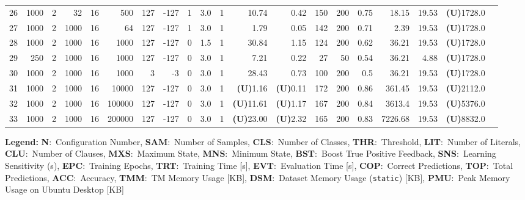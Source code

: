 \documentclass[english]{aghengthesis} %
\begin{document}
\begin{table}[!htbp]
\begin{tabular}{@{}r r r r r r r r r r r r r r r r r r r r@{}}
    26 & 1000 & 2 & 32 & 16 & 500 & 127 & -127 & 1 & 3.0 & 1 & 10.74 & 0.42 & 150 & 200 & 0.75 & 18.15 & 19.53 & \textbf{(U)}1728.0 \\
    27 & 1000 & 2 & 1000 & 16 & 64 & 127 & -127 & 1 & 3.0 & 1 & 1.79 & 0.05 & 142 & 200 & 0.71 & 2.39 & 19.53 & \textbf{(U)}1728.0 \\
    28 & 1000 & 2 & 1000 & 16 & 1000 & 127 & -127 & 0 & 1.5 & 1 & 30.84 & 1.15 & 124 & 200 & 0.62 & 36.21 & 19.53 & \textbf{(U)}1728.0 \\
    29 & 250 & 2 & 1000 & 16 & 1000 & 127 & -127 & 0 & 3.0 & 1 & 7.21 & 0.22 & 27 & 50 & 0.54 & 36.21 & 4.88 & \textbf{(U)}1728.0 \\
    30 & 1000 & 2 & 1000 & 16 & 1000 & 3 & -3 & 0 & 3.0 & 1 & 28.43 & 0.73 & 100 & 200 & 0.5 & 36.21 & 19.53 & \textbf{(U)}1728.0 \\
    31 & 1000 & 2 & 1000 & 16 & 10000 & 127 & -127 & 0 & 3.0 & 1 & \textbf{(U)}1.16 & \textbf{(U)}0.11 & 172 & 200 & 0.86 & 361.45 & 19.53 & \textbf{(U)}2112.0 \\
    32 & 1000 & 2 & 1000 & 16 & 100000 & 127 & -127 & 0 & 3.0 & 1 & \textbf{(U)}11.61 & \textbf{(U)}1.17 & 167 & 200 & 0.84 & 3613.4 & 19.53 & \textbf{(U)}5376.0 \\
    33 & 1000 & 2 & 1000 & 16 & 200000 & 127 & -127 & 0 & 3.0 & 1 & \textbf{(U)}23.00 & \textbf{(U)}2.32 & 165 & 200 & 0.83 & 7226.68 & 19.53 & \textbf{(U)}8832.0 \\ \bottomrule
\end{tabular}
\vspace{1ex}
\begin{flushleft}
\textbf{Legend:} 
\textbf{N}:~Configuration Number,
\textbf{SAM}:~Number of Samples, 
\textbf{CLS}:~Number of Classes, 
\textbf{THR}:~Threshold, 
\textbf{LIT}:~Number of Literals, 
\textbf{CLU}:~Number of Clauses, 
\textbf{MXS}:~Maximum State,
\textbf{MNS}:~Minimum State,
\textbf{BST}:~Boost True Positive Feedback,
\textbf{SNS}:~Learning Sensitivity (s),
\textbf{EPC}:~Training Epochs,
\textbf{TRT}:~Training Time [s],
\textbf{EVT}:~Evaluation Time [s],
\textbf{COP}:~Correct Predictions,
\textbf{TOP}:~Total Predictions,
\textbf{ACC}:~Accuracy,
\textbf{TMM}:~TM Memory Usage [KB],
\textbf{DSM}:~Dataset Memory Usage (\texttt{static}) [KB],
\textbf{PMU}:~Peak Memory Usage on Ubuntu Desktop [KB]
\end{flushleft}
\label{tab:noisy-xor-pi-pico}
\end{table}

\clearpage
\end{document}
